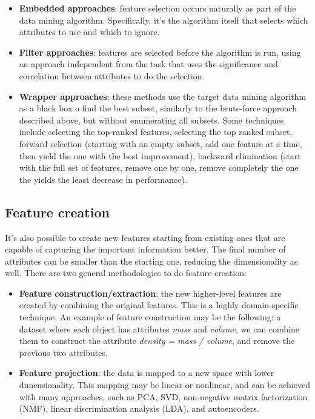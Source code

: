 \begin{itemize}
    \item \textbf{Embedded approaches}: feature selection occurs naturally as part of the data mining algorithm. Specifically, it's the algorithm itself that selects which attributes to use and which to ignore. 

    \item \textbf{Filter approaches}: features are selected before the algorithm is run, using an approach independent from the task that uses the significance and correlation between attributes to do the selection.

    \item \textbf{Wrapper approaches}: these methods use the target data mining algorithm as a black box o find the best subset, similarly to the brute-force approach described above, but without enumerating all subsets. Some techniques include selecting the top-ranked features, selecting the top ranked subset, forward selection (starting with an empty subset, add one feature at a time, then yield the one with the best improvement), backward elimination (start with the full set of features, remove one by one, remove completely the one the yields the least decrease in performance).
\end{itemize}

\subsection{Feature creation}

It's also possible to create new features starting from existing ones that are capable of capturing the important information better. The final number of attributes can be smaller than the starting one, reducing the dimensionality as well. There are two general methodologies to do feature creation:

\begin{itemize}
    \item \textbf{Feature construction/extraction}: the new higher-level features are created by combining the original features. This is a highly domain-specific technique. An example of feature construction may be the following: a dataset where each object has attributes \textit{mass} and \textit{volume}, we can combine them to construct the attribute \textit{density = mass / volume}, and remove the previous two attributes.

    \item \textbf{Feature projection}: the data is mapped to a new space with lower dimensionality. This mapping may be linear or nonlinear, and can be achieved with many approaches, such as PCA, SVD, non-negative matrix factorization (NMF), linear discrimination analysis (LDA), and autoencoders.
\end{itemize}


